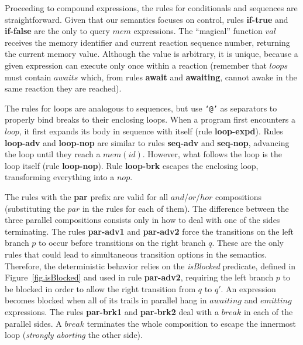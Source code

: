 \documentclass{acm_proc_article-sp}
\newcommand{\code}[1] {{\small{\texttt{#1}}}}
\newcommand{\rr}[1] {{\textbf{\scriptsize{#1}}}}
\newcommand{\1}{\;}
\newcommand{\2}{\;\;}
\newcommand{\3}{\;\;\;}
\newcommand{\5}{\;\;\;\;\;}
\begin{document}
Proceeding to compound expressions, the rules for conditionals and sequences 
are straightforward.
%
Given that our semantics focuses on control, rules \rr{if-true} and 
\rr{if-false} are the only to query $mem$ expressions.
%
The ``magical'' function $val$ receives the memory identifier and current 
reaction sequence number, returning the current memory value.
%
Although the value is arbitrary, it is unique, because a given expression can 
execute only once within a reaction (remember that $loops$ must contain 
$awaits$ which, from rules \rr{await} and \rr{awaiting}, cannot awake in the 
same reaction they are reached).

The rules for loops are analogous to sequences, but use \code{`@'} as 
separators to properly bind breaks to their enclosing loops.
%
When a program first encounters a $loop$, it first expands its body in sequence 
with itself (rule \rr{loop-expd}).
Rules \rr{loop-adv} and \rr{loop-nop} are similar to rules \rr{seq-adv} and 
\rr{seq-nop}, advancing the loop until they reach a $mem(id)$.
However, what follows the loop is the loop itself (rule \rr{loop-nop}).
%
Rule \rr{loop-brk} escapes the enclosing loop, transforming everything into a 
$nop$.

The rules with the \rr{par} prefix are valid for all $and$/$or$/$hor$ 
compositions (substituting the $par$ in the rules for each of them).
%
The difference between the three parallel compositions consists only in how to 
deal with one of the sides terminating.
%
The rules \rr{par-adv1} and \rr{par-adv2} force the transitions on the left 
branch $p$ to occur before transitions on the right branch $q$.
%
These are the only rules that could lead to simultaneous transition options in 
the semantics.
Therefore, the deterministic behavior relies on the \emph{isBlocked} predicate, 
defined in Figure~\ref{fig.isBlocked} and used in rule \rr{par-adv2}, requiring 
the left branch $p$ to be blocked in order to allow the right transition from 
$q$ to $q'$.
%
An expression becomes blocked when all of its trails in parallel hang in 
$awaiting$ and $emitting$ expressions.
%
The rules \rr{par-brk1} and \rr{par-brk2} deal with a $break$ in each of the 
parallel sides.
A $break$ terminates the whole composition to escape the innermost loop 
(\emph{strongly aborting} the other side).
\end{document}
